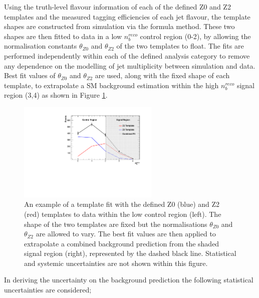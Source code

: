 Using the truth-level flavour information of each of the defined Z0 and Z2 templates and the measured tagging efficiencies of each jet flavour, the template shapes are constructed from simulation via the formula method. These two shapes are then fitted to data in a low $n_{b}^{reco}$ control region (0-2), by allowing the normalisation constants $\theta_{Z0}$ and $\theta_{Z2}$ of the two templates to float. The fits are performed independently within each of the defined analysis category to remove any dependence on the modelling of jet multiplicity between simulation and data. Best fit values of $\theta_{Z0}$ and $\theta_{Z2}$ are used, along with the fixed shape of each template, to extrapolate a \ac{SM} background estimation within the high $n_{b}^{reco}$ signal region (3,4) as shown in Figure \ref{fig:templateexample}. 

 \begin{figure}[!h]
 \centering
\includegraphics[width=0.60\textwidth]{plots/Template_Example.pdf}
\caption[An example of a template fit with the defined Z0 (blue) and Z2 (red) templates to data within the low \nbreco control region (left).]{An example of a template fit with the defined Z0 (blue) and Z2 (red) templates to data within the low \nbreco control region (left). The shape of the two templates are fixed but the normalisations $\theta_{Z0}$ and $\theta_{Z2}$ are allowed to vary. The best fit values are then applied to extrapolate a combined background prediction from the shaded signal region (right), represented by the dashed black line. Statistical and systemic uncertainties are not shown within this figure.}  
\label{fig:templateexample}
\end{figure}

In deriving the uncertainty on the background prediction the following statistical uncertainties are considered; 

